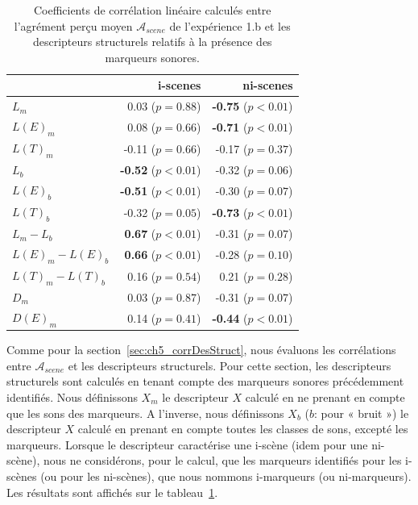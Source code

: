 \begin{table}[t]
\centering
\begin{tabular}{l r r} 
                  &   i-scenes                  & ni-scenes \\
\hline
$L_m$              & 0.03  ($p=0.88$)           & \textbf{-0.75} ($p<0.01$) \\
$L(E)_m$           & 0.08  ($p=0.66$)           & \textbf{-0.71} ($p<0.01$) \\
$L(T)_m$           & -0.11 ($p=0.66$)           & -0.17 ($p=0.37$) \\
$L_b$              & \textbf{-0.52} ($p<0.01$)  & -0.32 ($p=0.06$) \\
$L(E)_b$           & \textbf{-0.51} ($p<0.01$)  & -0.30 ($p=0.07$) \\
$L(T)_b$           & -0.32 ($p=0.05$)           & \textbf{-0.73} ($p<0.01$) \\
$L_m-L_b$          & \textbf{0.67} ($p<0.01$)   & -0.31 ($p=0.07$) \\
$L(E)_m-L(E)_b$    & \textbf{0.66} ($p<0.01$)   & -0.28 ($p=0.10$) \\
$L(T)_m-L(T)_b$    & 0.16 ($p=0.54$)            & 0.21 ($p=0.28$) \\
$D_m$              & 0.03 ($p=0.87$)            & -0.31 ($p=0.07$) \\
$D(E)_m$           & 0.14 ($p=0.41$)            & \textbf{-0.44} ($p<0.01$) \\
\hline
\end{tabular}
\vspace{0.5mm}
\caption{Coefficients de corrélation linéaire calculés entre l'agrément perçu moyen $\mathcal{A}_{scene}$ de l'expérience 1.b et les descripteurs structurels relatifs à la présence des marqueurs sonores.}
\label{tab:corrMarkers}
\end{table}

Comme pour la section~\ref{sec:ch5_corrDesStruct}, nous évaluons les corrélations entre $\mathcal{A}_{scene}$ et les descripteurs structurels. Pour cette section, les descripteurs structurels sont calculés en tenant compte des marqueurs sonores précédemment identifiés. Nous définissons $X_m$ le descripteur $X$ calculé en ne prenant en compte que les sons des marqueurs. A l'inverse, nous définissons $X_b$ ($b$: pour « bruit ») le descripteur $X$ calculé en prenant en compte toutes les classes de sons, excepté les marqueurs. Lorsque le descripteur caractérise une i-scène (idem pour une ni-scène), nous ne considérons, pour le calcul, que les marqueurs identifiés pour les i-scènes (ou pour les ni-scènes), que nous nommons i-marqueurs (ou ni-marqueurs). Les résultats sont affichés sur le tableau~\ref{tab:corrMarkers}.

